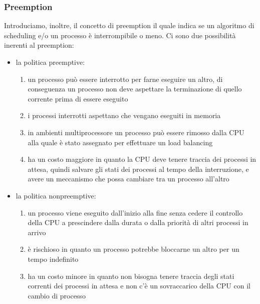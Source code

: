 \subsubsection{Preemption}
Introduciamo, inoltre, il concetto di preemption il quale indica se un algoritmo di scheduling e/o un processo è interrompibile o meno. Ci sono due possibilità inerenti al preemption:
\begin{itemize}
    \item la politica preemptive: 
    \begin{enumerate}
        \item un processo può essere interrotto per farne eseguire un altro, di conseguenza un processo non deve aspettare la terminazione di quello corrente prima di essere eseguito
        \item i processi interrotti aspettano che vengano eseguiti in memoria
        \item in ambienti multiprocessore un processo può essere rimosso dalla CPU alla quale è stato assegnato per effettuare un load balancing
        \item ha un costo maggiore in quanto la CPU deve tenere traccia dei processi in attesa, quindi salvare gli stati dei processi al tempo della interruzione, e avere un meccanismo che possa cambiare tra un processo all'altro
    \end{enumerate}

    \item la politica nonpreemptive:
    \begin{enumerate}
        \item un processo viene eseguito dall'inizio alla fine senza cedere il controllo della CPU a prescindere dalla durata o dalla priorità di altri processi in arrivo
        \item è rischioso in quanto un processo potrebbe bloccarne un altro per un tempo indefinito
        \item ha un costo minore in quanto non bisogna tenere traccia degli stati correnti dei processi in attesa e non c'è un sovraccarico della CPU con il cambio di processo
    \end{enumerate}
\end{itemize}

